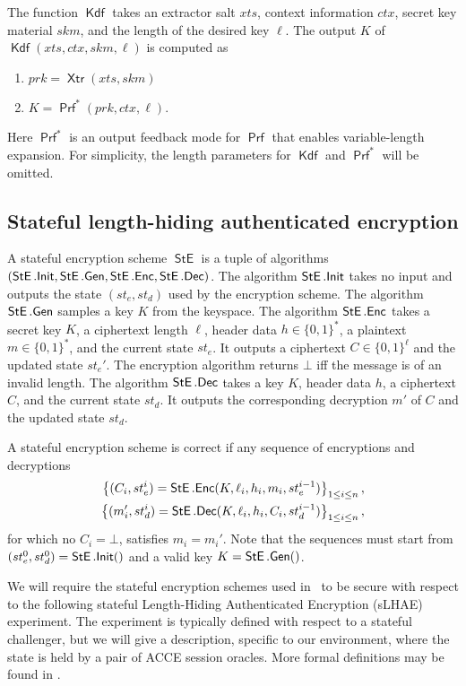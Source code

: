 \documentclass[USenglish,oneside,twocolumn]{article}
\theoremstyle{dgthm}
\theoremstyle{dgdef}
\newcommand{\hybrid}{{\sf {hybrid}}}
\newcommand{\AlgorithmName}[1]{\operatorname{\mathsf{#1}}}
\newcommand{\KDF}{\AlgorithmName{Kdf}}
\newcommand{\PRF}{\AlgorithmName{Prf}}
\newcommand{\XTR}{\AlgorithmName{Xtr}}
\newcommand{\STE}{\AlgorithmName{StE}}
\begin{document}
    The function $\KDF$ takes an extractor salt $xts$, context information
    $ctx$, secret key material $skm$, and the length of the desired key $\ell$.
    The output $K$ of $\KDF(xts, ctx, skm, \ell)$ is computed as
    \begin{enumerate}
      \item $prk = \XTR(xts, skm)$
      \item $K = \PRF^*(prk, ctx, \ell)$.
    \end{enumerate}
    Here $\PRF^*$ is an output feedback mode for $\PRF$ that enables variable-length
    expansion. For simplicity, the length parameters for $\KDF$ and $\PRF^*$ will be
    omitted.


\subsection{Stateful length-hiding authenticated encryption}\label{sec:slhae}

  A stateful encryption scheme $\STE$ is a tuple of algorithms $(\STE.{\sf
  Init}, \STE.{\sf Gen}, \STE.{\sf Enc}, \STE.{\sf Dec})$.  The algorithm
  $\STE.{\sf Init}$ takes no input and outputs the state $(st_e, st_d)$ used by
  the encryption scheme. The algorithm $\STE.{\sf Gen}$ samples a key $K$ from
  the keyspace. The algorithm $\STE.{\sf Enc}$ takes a secret key $K$, a
  ciphertext length $\ell$, header data $h\in\{0,1\}^*$, a plaintext $m \in
  \{0,1\}^*$, and the current state $st_e$. It outputs a ciphertext
  $C\in\{0,1\}^\ell$ and the updated state $st_e'$. The encryption algorithm
  returns $\bot$ iff the message is of an invalid length.
  The algorithm $\STE.{\sf Dec}$ takes a key $K$, header data $h$, a ciphertext
  $C$, and the current state $st_d$. It outputs the corresponding decryption $m'$
  of $C$ and the updated state $st_d$.

  A stateful encryption scheme is correct if any sequence of encryptions and
  decryptions
  \begin{align*}
  \left\{(C_{i}, st_e^{i}) = \STE.{\sf Enc}(K, \ell_i, h_i, m_i, st_e^{i-1})\right\}_{1\le i \le n},\\
  \left\{(m'_{i}, st_d^{i}) = \STE.{\sf Dec}(K, \ell_i, h_i, C_i, st_d^{i-1})\right\}_{1 \le i \le n},
  \end{align*}
  for which no $C_i = \bot$, satisfies $m_i = m_i'$.
  Note that the sequences must start from
  $(st_e^0, st_d^0) = \STE.{\sf Init}()$ and a valid key $K = \STE.{\sf Gen}()$.

  We will require the stateful encryption schemes used in \hybrid~to
  be secure with respect to the following stateful Length-Hiding Authenticated
  Encryption (sLHAE) experiment. The experiment is typically defined with
  respect to a stateful challenger, but we will give a description, specific
  to our environment, where the state is held by a pair of ACCE session oracles.
  More formal definitions may be found in \cite{Krawczyk2013}.
\end{document}
